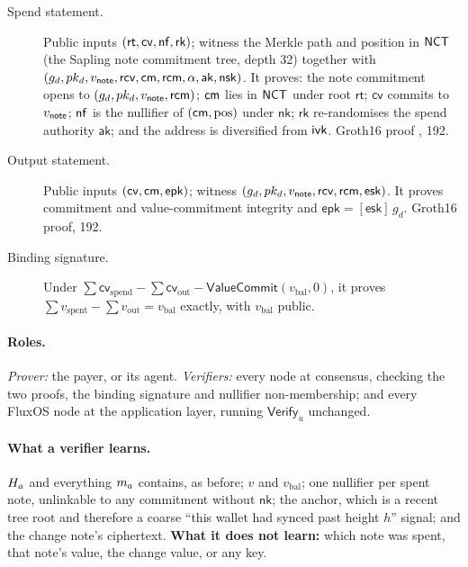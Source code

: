 \begin{description}
  \item[Spend statement.] Public inputs $(\mathsf{rt}, \mathsf{cv}, \mathsf{nf}, \mathsf{rk})$; witness the
    Merkle path and position in $\mathsf{NCT}$ (the Sapling note commitment tree, depth \num{32}) together
    with $(g_d, pk_d, v_{\mathsf{note}}, \mathsf{rcv}, \mathsf{cm}, \mathsf{rcm}, \alpha, \mathsf{ak}, \mathsf{nsk})$.
    It proves: the note commitment opens to $(g_d, pk_d, v_{\mathsf{note}}, \mathsf{rcm})$; $\mathsf{cm}$ lies in
    $\mathsf{NCT}$ under root $\mathsf{rt}$; $\mathsf{cv}$ commits to $v_{\mathsf{note}}$; $\mathsf{nf}$ is the nullifier of
    $(\mathsf{cm},\mathrm{pos})$ under $\mathsf{nk}$; $\mathsf{rk}$ re-randomises the spend authority
    $\mathsf{ak}$; and the address is diversified from $\mathsf{ivk}$. Groth16 proof
    \citep{groth2016size}, \qty{192}{\byte}.
  \item[Output statement.] Public inputs $(\mathsf{cv}, \mathsf{cm}, \mathsf{epk})$; witness
    $(g_d, pk_d, v_{\mathsf{note}}, \mathsf{rcv}, \mathsf{rcm}, \mathsf{esk})$. It proves commitment and
    value-commitment integrity and $\mathsf{epk} = [\mathsf{esk}]\,g_d$. Groth16 proof,
    \qty{192}{\byte}.
  \item[Binding signature.] Under
    $\sum \mathsf{cv}_{\mathrm{spend}} - \sum \mathsf{cv}_{\mathrm{out}} -
    \mathsf{ValueCommit}(v_{\mathrm{bal}},0)$, it proves
    $\sum v_{\mathrm{spent}} - \sum v_{\mathrm{out}} = v_{\mathrm{bal}}$ exactly, with
    $v_{\mathrm{bal}}$ public.
\end{description}

\paragraph{Roles.} \emph{Prover:} the payer, or its agent. \emph{Verifiers:} every \fluxd{} node at
consensus, checking the two proofs, the binding signature and nullifier non-membership; and every
FluxOS node at the application layer, running $\mathsf{Verify}_u$ unchanged.

\paragraph{What a verifier learns.} $H_{a}$ and everything $m_{a}$ contains, as before; $v$ and
$v_{\mathrm{bal}}$; one nullifier per spent note, unlinkable to any commitment without $\mathsf{nk}$;
the anchor, which is a recent tree root and therefore a coarse ``this wallet had synced past height
$h$'' signal; and the change note's ciphertext. \textbf{What it does not learn:} which note was spent,
that note's value, the change value, or any key.

